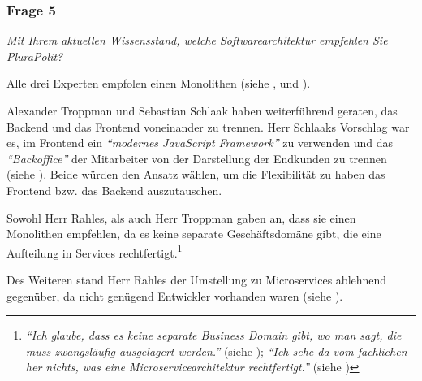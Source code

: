 \subsubsection{Frage 5}

\textit{Mit Ihrem aktuellen Wissensstand, welche Softwarearchitektur empfehlen Sie PluraPolit?}

Alle drei Experten empfolen einen Monolithen (siehe ,  und ).

Alexander Troppman und Sebastian Schlaak haben weiterführend geraten, das Backend und das Frontend voneinander zu trennen. Herr Schlaaks Vorschlag war es, im Frontend ein \textit{\enquote{modernes JavaScript Framework}} zu verwenden und das \textit{\enquote{Backoffice}} der Mitarbeiter von der Darstellung der Endkunden zu trennen (siehe ). Beide würden den Ansatz wählen, um die Flexibilität zu haben das Frontend bzw. das Backend auszutauschen.

Sowohl Herr Rahles, als auch Herr Troppman gaben an, dass sie einen Monolithen empfehlen, da es keine separate Geschäftsdomäne gibt, die eine Aufteilung in Services rechtfertigt.\footnote{
\textit{\enquote{Ich glaube, dass es keine separate Business Domain gibt, wo man sagt, die muss zwangsläufig ausgelagert werden.}} (siehe ); \textit{\enquote{Ich sehe da vom fachlichen her nichts, was eine Microservicearchitektur rechtfertigt.}} (siehe )
}

Des Weiteren stand Herr Rahles der Umstellung zu Microservices ablehnend gegenüber, da nicht genügend Entwickler vorhanden waren (siehe ).